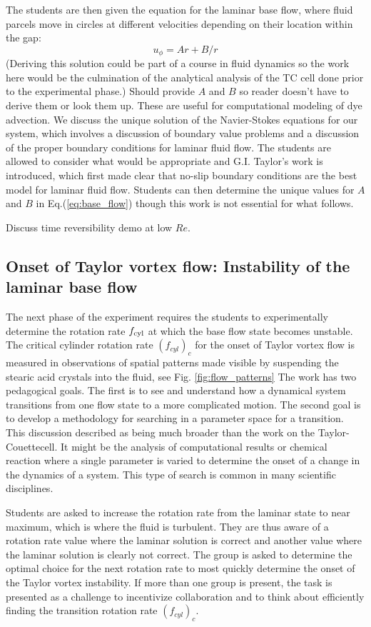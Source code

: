 \documentclass[%
reprint,
 amsmath,amssymb,
 aps,
prb,
floatfix,
longbibliography,
notitlepage
]{revtex4-1}
\newcommand{\BE}{\begin{equation}}
\newcommand{\EE}{\end{equation}}
\newcommand{\DB}[1]{{\color{red}#1}} %
\newcommand{\TC}{Taylor-Couette}
\newcommand{\vel}{\ensuremath{u}} %
\newcommand{\ReN}{\ensuremath{Re}} %
\begin{document}
The students are then given the equation for the laminar base flow, where fluid parcels move in circles at different velocities depending on their location within the gap: 
\BE
\vel_\phi = Ar + B/r
\label{eq:base_flow}
\EE
(Deriving this solution could be part of a course in fluid dynamics so the work here would be the culmination of the analytical analysis of the TC cell done prior to the experimental phase.) \DB{Should provide $A$ and $B$ so reader doesn't have to derive them or look them up. These are useful for computational modeling of dye advection.} We discuss the unique solution of the Navier-Stokes equations for our system, which involves a discussion of boundary value problems and a discussion of the proper boundary conditions for laminar fluid flow. The students are allowed to consider what would be appropriate and G.I. Taylor's work is introduced, which first made clear that no-slip boundary conditions are the best model for laminar fluid flow. Students can then determine the unique values for $A$ and $B$ in Eq.(\ref{eq:base_flow}) though this work is not essential for what follows. 

\DB{Discuss time reversibility demo at low \ReN.}

\subsection{Onset of Taylor vortex flow: Instability of the laminar base flow}

The next phase of the experiment requires the students to experimentally determine the rotation rate $f_{\rm cyl}$ at which the base flow state becomes unstable. The critical cylinder rotation rate $(f_{cyl})_c$ for the onset of Taylor vortex flow is measured in observations of spatial patterns made visible by suspending the stearic acid crystals into the fluid, see Fig. \ref{fig:flow_patterns}  The work has two pedagogical goals. The first is to see and understand how a dynamical system transitions from one flow state to a more complicated motion. The second goal is to develop a methodology for searching in a parameter space for a transition. This discussion described as being much broader than the work on the \TC cell. It might be the analysis of computational results or chemical reaction where a single parameter is varied to determine the onset of a change in the dynamics of a system. This type of search is common in many scientific disciplines. 

Students are asked to increase the rotation rate from the laminar state to near maximum, which is where the fluid is turbulent. They are thus aware of a rotation rate value where the laminar solution is correct and another value where the laminar solution is clearly not correct. The group is asked to determine the optimal choice for the next rotation rate to most quickly determine the onset of the Taylor vortex instability. If more than one group is present, the task is presented as a challenge to incentivize  collaboration and to think about efficiently finding the transition rotation rate $(f_{cyl})_c$.
\end{document}
